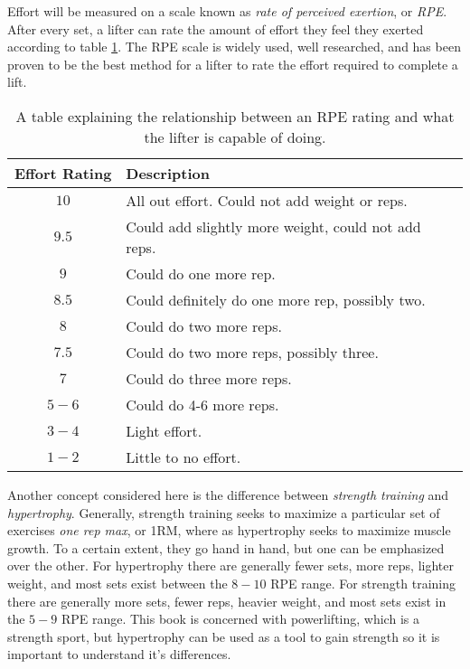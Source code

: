 Effort will be measured on a scale known as \textit{rate of perceived exertion}, or \textit{RPE}. After every set, a lifter can rate the amount of effort they feel they exerted according to table \ref{tab:RPETable}. The RPE scale is widely used, well researched, and has been proven to be the best method for a lifter to rate the effort required to complete a lift. \cite{RPE_ACCURACY}

\begin{table}[h]
    \centering
    \begin{tabular}{c|l}
        Effort Rating & Description \\
        \hline
        $10$ & All out effort. Could not add weight or reps. \\
        $9.5$ & Could add slightly more weight, could not add reps. \\
        $9$ & Could do one more rep. \\
        $8.5$ & Could definitely do one more rep, possibly two. \\
        $8$ & Could do two more reps. \\
        $7.5 $& Could do two more reps, possibly three. \\
        $7$ & Could do three more reps. \\
        $5-6$ & Could do 4-6 more reps. \\
        $3-4$ & Light effort. \\
        $1-2$ & Little to no effort.
    \end{tabular}
    \caption{A table explaining the relationship between an RPE rating and what the lifter is capable of doing.}
    \label{tab:RPETable}
\end{table}

Another concept considered here is the difference between \textit{strength training} and \textit{hypertrophy}. Generally, strength training seeks to maximize a particular set of exercises \textit{one rep max}, or 1RM, where as hypertrophy seeks to maximize muscle growth. To a certain extent, they go hand in hand, but one can be emphasized over the other. For hypertrophy there are generally fewer sets, more reps, lighter weight, and most sets exist between the $8-10$ RPE range. For strength training there are generally more sets, fewer reps, heavier weight, and most sets exist in the $5-9$ RPE range. This book is concerned with powerlifting, which is a strength sport, but hypertrophy can be used as a tool to gain strength so it is important to understand it's differences.

